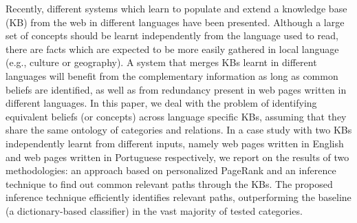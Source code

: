Recently, different systems which learn to populate and extend a knowledge base (KB) from the web in different languages have been presented. Although a large set of concepts should be learnt independently from the language used to read, there are facts which are expected to be more easily gathered in local language (e.g., culture or geography). A system that merges KBs learnt in different languages will benefit from the complementary information as long as common beliefs are identified, as well as from redundancy present in web pages written in different languages. In this paper, we deal with the problem of identifying equivalent beliefs (or concepts) across language specific KBs, assuming that they share the same ontology of categories and relations. In a case study with two KBs independently learnt from different inputs, namely web pages written in English and web pages written in Portuguese respectively, we report on the results of two methodologies: an approach based on personalized PageRank and an inference technique to find out common relevant paths through the KBs. The proposed inference technique efficiently identifies relevant paths, outperforming the baseline (a dictionary-based classifier) in the vast majority of tested categories.
